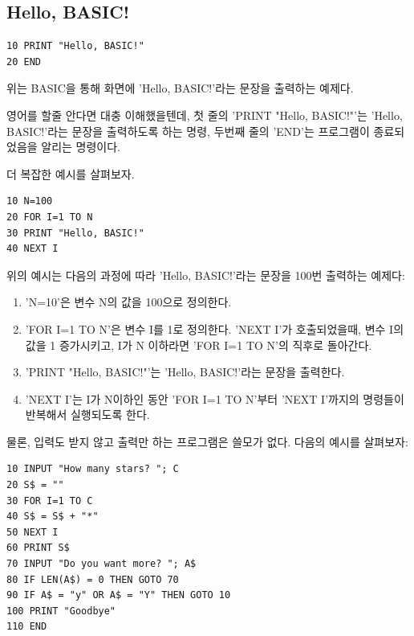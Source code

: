 \documentclass{article}
\begin{document}
\subsection{Hello, BASIC!}

\begin{lstlisting}
10 PRINT "Hello, BASIC!"
20 END
\end{lstlisting}

위는 BASIC을 통해 화면에 'Hello, BASIC!'라는 문장을 출력하는 예제다.

영어를 할줄 안다면 대충 이해했을텐데, 
첫 줄의 'PRINT "Hello, BASIC!"'는 'Hello, BASIC!'라는 문장을 출력하도록 하는 명령,
두번째 줄의 'END'는 프로그램이 종료되었음을 알리는 명령이다.

더 복잡한 예시를 살펴보자.

\begin{lstlisting}
10 N=100
20 FOR I=1 TO N
30 PRINT "Hello, BASIC!"
40 NEXT I
\end{lstlisting}

위의 예시는 다음의 과정에 따라 'Hello, BASIC!'라는 문장을 100번 출력하는 예제다:

\begin{enumerate}
    \item 'N=10'은 변수 N의 값을 100으로 정의한다.
    \item 'FOR I=1 TO N'은 변수 I를 1로 정의한다.
    'NEXT I'가 호출되었을때, 변수 I의 값을 1 증가시키고,
    I가 N 이하라면 'FOR I=1 TO N'의 직후로 돌아간다.
    \item 'PRINT "Hello, BASIC!"'는 'Hello, BASIC!'라는 문장을 출력한다.
    \item 'NEXT I'는 I가 N이하인 동안 'FOR I=1 TO N'부터 'NEXT I'까지의 명령들이 반복해서 실행되도록 한다.
\end{enumerate}

물론, 입력도 받지 않고 출력만 하는 프로그램은 쓸모가 없다.
다음의 예시를 살펴보자:

\begin{lstlisting}
10 INPUT "How many stars? "; C
20 S$ = ""
30 FOR I=1 TO C
40 S$ = S$ + "*"
50 NEXT I
60 PRINT S$
70 INPUT "Do you want more? "; A$
80 IF LEN(A$) = 0 THEN GOTO 70
90 IF A$ = "y" OR A$ = "Y" THEN GOTO 10
100 PRINT "Goodbye"
110 END
\end{lstlisting}
\end{document}
